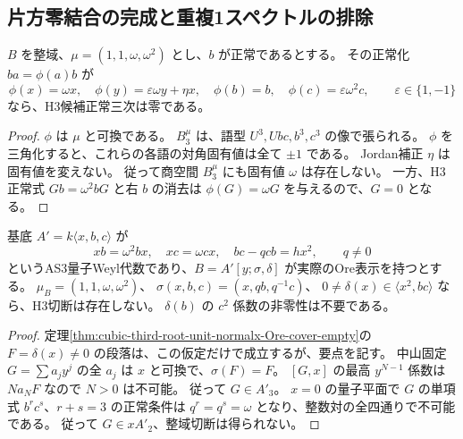 \subsection{片方零結合の完成と重複1スペクトルの排除}
\label{subsec:cubic-third-root-unit-onezero-completion}
\begin{lemma}[正常 $b$ の固有値障害]
\label{lem:cubic-third-root-unit-normal-b-spectrum}
$B$ を整域、$\mu=(1,1,\omega,\omega^2)$ とし、$b$ が正常であるとする。
その正常化 $ba=\phi(a)b$ が
\[
 \phi(x)=\omega x,\quad
 \phi(y)=\varepsilon\omega y+\eta x,\quad
 \phi(b)=b,\quad\phi(c)=\varepsilon\omega^2c,
 \qquad\varepsilon\in\{1,-1\}
\]
なら、H3候補正常三次は零である。
\end{lemma}
\begin{proof}
$\phi$ は $\mu$ と可換である。
$B_3^\mu$ は、語型 $U^3,Ubc,b^3,c^3$ の像で張られる。
$\phi$ を三角化すると、これらの各語の対角固有値は全て $\pm1$ である。
Jordan補正 $\eta$ は固有値を変えない。
従って商空間 $B_3^\mu$ にも固有値 $\omega$ は存在しない。
一方、H3正常式 $Gb=\omega^2bG$ と右 $b$ の消去は
$\phi(G)=\omega G$ を与えるので、$G=0$ となる。
\end{proof}

\begin{proposition}
\label{prop:cubic-third-root-unit-onecurved-F}
基底 $A'=k\langle x,b,c\rangle$ が
\[
 xb=\omega^2bx,\quad xc=\omega cx,\quad bc-qcb=h x^2,
 \qquad q\ne0
\]
というAS3量子Weyl代数であり、$B=A'[y;\sigma,\delta]$ が実際のOre表示を持つとする。
$\mu_B=(1,1,\omega,\omega^2)$、
$\sigma(x,b,c)=(x,qb,q^{-1}c)$、
$0\ne\delta(x)\in\langle x^2,bc\rangle$ なら、H3切断は存在しない。
$\delta(b)$ の $c^2$ 係数の非零性は不要である。
\end{proposition}
\begin{proof}
定理\ref{thm:cubic-third-root-unit-normalx-Ore-cover-empty}の
$F=\delta(x)\ne0$ の段落は、この仮定だけで成立するが、要点を記す。
中山固定 $G=\sum a_jy^j$ の全 $a_j$ は $x$ と可換で、$\sigma(F)=F$。
$[G,x]$ の最高 $y^{N-1}$ 係数は $Na_NF$ なので $N>0$ は不可能。
従って $G\in A'_3$。
$x=0$ の量子平面で $G$ の単項式 $b^rc^s$、$r+s=3$ の正常条件は
$q^r=q^s=\omega$ となり、整数対の全四通りで不可能である。
従って $G\in xA'_2$、整域切断は得られない。
\end{proof}

